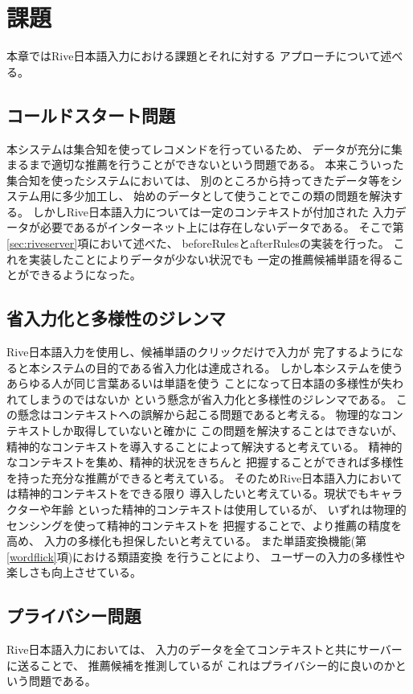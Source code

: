 \chapter{課題}
\label{chap:discussion}
本章ではRive日本語入力における課題とそれに対する
アプローチについて述べる。

\newpage
\section{コールドスタート問題}
本システムは集合知を使ってレコメンドを行っているため、
データが充分に集まるまで適切な推薦を行うことができないという問題である。
本来こういった集合知を使ったシステムにおいては、
別のところから持ってきたデータ等をシステム用に多少加工し、
始めのデータとして使うことでこの類の問題を解決する。
しかしRive日本語入力については一定のコンテキストが付加された
入力データが必要であるがインターネット上には存在しないデータである。
そこで第\ref{sec:riveserver}項において述べた、
beforeRulesとafterRulesの実装を行った。
これを実装したことによりデータが少ない状況でも
一定の推薦候補単語を得ることができるようになった。

\section{省入力化と多様性のジレンマ}
Rive日本語入力を使用し、候補単語のクリックだけで入力が
完了するようになると本システムの目的である省入力化は達成される。
しかし本システムを使うあらゆる人が同じ言葉あるいは単語を使う
ことになって日本語の多様性が失われてしまうのではないか
という懸念が省入力化と多様性のジレンマである。
この懸念はコンテキストへの誤解から起こる問題であると考える。
物理的なコンテキストしか取得していないと確かに
この問題を解決することはできないが、
精神的なコンテキストを導入することによって解決すると考えている。
精神的なコンテキストを集め、精神的状況をきちんと
把握することができれば多様性を持った充分な推薦ができると考えている。
そのためRive日本語入力においては精神的コンテキストをできる限り
導入したいと考えている。現状でもキャラクターや年齢
といった精神的コンテキストは使用しているが、
いずれは物理的センシングを使って精神的コンテキストを
把握することで、より推薦の精度を高め、
入力の多様化も担保したいと考えている。
また単語変換機能(第\ref{wordflick}項)における類語変換
を行うことにより、
ユーザーの入力の多様性や楽しさも向上させている。

\section{プライバシー問題}
Rive日本語入力においては、
入力のデータを全てコンテキストと共にサーバーに送ることで、
推薦候補を推測しているが
これはプライバシー的に良いのかという問題である。


